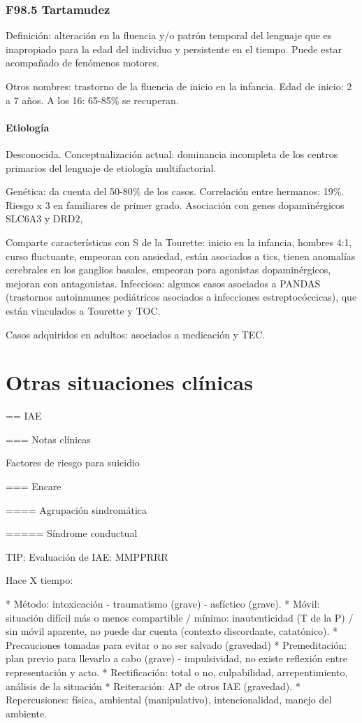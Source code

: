 \documentclass{scrbook}
\begin{document}
\section*{F98.5 Tartamudez}
Definición: alteración en la fluencia y/o patrón temporal del lenguaje que es inapropiado para la edad del individuo y persistente en el tiempo. Puede estar acompañado de fenómenos motores.

Otros nombres: trastorno de la fluencia de inicio en la infancia.
Edad de inicio: 2 a 7 años. A los 16: 65-85\% se recuperan.
\subsection*{Etiología}
Desconocida. Conceptualización actual: dominancia incompleta de los centros primarios del lenguaje de etiología multifactorial.

Genética: da cuenta del 50-80\% de los casos. Correlación entre hermanos: 19\%. Riesgo x 3 en familiares de primer grado. Asociación con genes dopaminérgicos SLC6A3 y DRD2,

Comparte características con S de la Tourette: inicio en la infancia, hombres 4:1, curso fluctuante, empeoran con ansiedad, están asociados a tics, tienen anomalías cerebrales en los ganglios basales, empeoran pora agonistas dopaminérgicos, mejoran con antagonistas.
Infecciosa: algunos casos asociados a PANDAS (trastornos autoinmunes pediátricos asociados a infecciones estreptocóccicas), que están vinculados a Tourette y TOC.

Casos adquiridos en adultos: asociados a medicación y TEC.

\part{Otras situaciones clínicas}
== IAE

=== Notas clínicas

Factores de riesgo para suicidio

=== Encare

==== Agrupación sindromática

===== Síndrome conductual

TIP: Evaluación de IAE: MMPPRRR

Hace X tiempo:

* Método: intoxicación - traumatismo (grave) - asfíctico (grave).
* Móvil: situación difícil más o menos compartible / mínimo: inautenticidad (T de la P) / sin móvil aparente, no puede dar cuenta (contexto discordante, catatónico).
* Precauciones tomadas para evitar o no ser salvado (gravedad)
* Premeditación: plan previo para llevarlo a cabo (grave) - impulsividad, no existe reflexión entre representación y acto.
* Rectificación: total o no, culpabilidad, arrepentimiento, análisis de la situación
* Reiteración: AP de otros IAE (gravedad).
* Repercusiones: física, ambiental (manipulativo), intencionalidad, manejo del ambiente.
\end{document}
